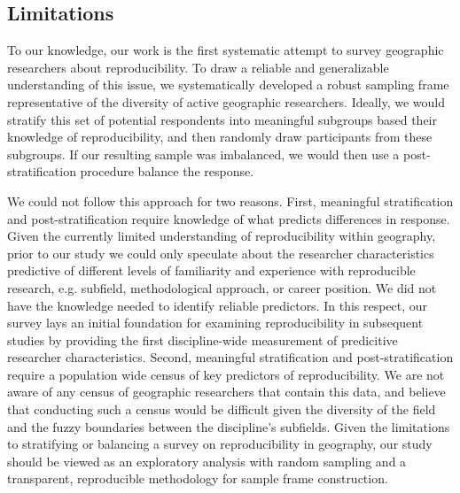 \documentclass[]{interact}
\theoremstyle{plain}%
\theoremstyle{definition}
\theoremstyle{remark}
\begin{document}
\subsection*{Limitations}
To our knowledge, our work is the first systematic attempt to survey geographic researchers about reproducibility. 
To draw a reliable and generalizable understanding of this issue, we systematically developed a robust sampling frame representative of the diversity of active geographic researchers. 
Ideally, we would stratify this set of potential respondents into meaningful subgroups based their knowledge of reproducibility, and then randomly draw participants from these subgroups. 
If our resulting sample was imbalanced, we would then use a post-stratification procedure balance the response.   

We could not follow this approach for two reasons. 
First, meaningful stratification and post-stratification require knowledge of what predicts differences in response.
Given the currently limited understanding of reproducibility within geography, prior to our study we could only speculate about the researcher characteristics predictive of different levels of familiarity and experience with reproducible research, e.g. subfield, methodological approach, or career position.
We did not have the knowledge needed to identify reliable predictors.
In this respect, our survey lays an initial foundation for examining reproducibility in subsequent studies by providing the first discipline-wide measurement of predicitive researcher characteristics. 
Second, meaningful stratification and post-stratification require a population wide census of key predictors of reproducibility.
We are not aware of any census of geographic researchers that contain this data, and believe that conducting such a census would be difficult given the diversity of the field and the fuzzy boundaries between the discipline's subfields.
Given the limitations to stratifying or balancing a survey on reproducibility in geography, our study should be viewed as an exploratory analysis with random sampling and a transparent, reproducible methodology for sample frame construction.
\end{document}
